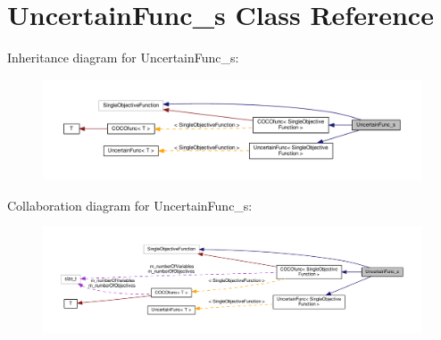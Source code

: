 \hypertarget{classUncertainFunc__s}{}\section{Uncertain\+Func\+\_\+s Class Reference}
\label{classUncertainFunc__s}


Inheritance diagram for Uncertain\+Func\+\_\+s\+:\nopagebreak
\begin{figure}[H]
\begin{center}
\leavevmode
\includegraphics[width=350pt]{classUncertainFunc__s__inherit__graph}
\end{center}
\end{figure}


Collaboration diagram for Uncertain\+Func\+\_\+s\+:\nopagebreak
\begin{figure}[H]
\begin{center}
\leavevmode
\includegraphics[width=350pt]{classUncertainFunc__s__coll__graph}
\end{center}
\end{figure}
